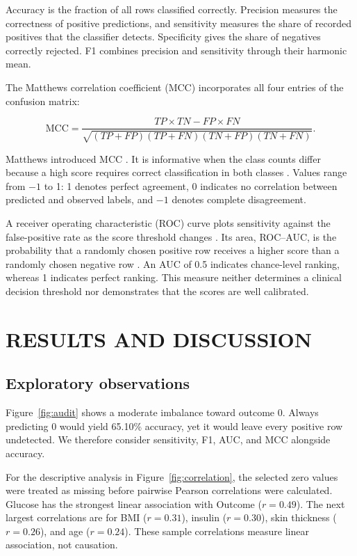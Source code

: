 \documentclass[pdflatex,sn-vancouver-num]{sn-jnl}
\begin{document}
Accuracy is the fraction of all rows classified correctly. Precision measures the correctness of positive predictions, and sensitivity measures the share of recorded positives that the classifier detects. Specificity gives the share of negatives correctly rejected. F1 combines precision and sensitivity through their harmonic mean.

The Matthews correlation coefficient (MCC) incorporates all four entries of the confusion matrix:

\begin{equation}
\mathrm{MCC}=\frac{TP\times TN-FP\times FN}
{\sqrt{(TP+FP)(TP+FN)(TN+FP)(TN+FN)}}.
\label{eq:mcc}
\end{equation}

Matthews introduced MCC \cite{matthews1975mcc}. It is informative when the class counts differ because a high score requires correct classification in both classes \cite{chicco2020mcc}. Values range from $-1$ to 1: 1 denotes perfect agreement, 0 indicates no correlation between predicted and observed labels, and $-1$ denotes complete disagreement.

A receiver operating characteristic (ROC) curve plots sensitivity against the false-positive rate as the score threshold changes \cite{fawcett2006roc}. Its area, ROC--AUC, is the probability that a randomly chosen positive row receives a higher score than a randomly chosen negative row \cite{hanley1982auc}. An AUC of 0.5 indicates chance-level ranking, whereas 1 indicates perfect ranking. This measure neither determines a clinical decision threshold nor demonstrates that the scores are well calibrated.

\section{RESULTS AND DISCUSSION}\label{sec:results}

\subsection{Exploratory observations}\label{subsec:eda}

Figure~\ref{fig:audit} shows a moderate imbalance toward outcome 0. Always predicting 0 would yield 65.10\% accuracy, yet it would leave every positive row undetected. We therefore consider sensitivity, F1, AUC, and MCC alongside accuracy.

For the descriptive analysis in Figure~\ref{fig:correlation}, the selected zero values were treated as missing before pairwise Pearson correlations were calculated. Glucose has the strongest linear association with Outcome ($r=0.49$). The next largest correlations are for BMI ($r=0.31$), insulin ($r=0.30$), skin thickness ($r=0.26$), and age ($r=0.24$). These sample correlations measure linear association, not causation.
\end{document}
